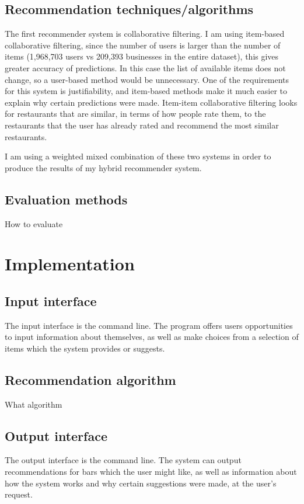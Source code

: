 \documentclass[conference]{IEEEtran}
\begin{document}
\subsection{Recommendation techniques/algorithms}
The first recommender system is collaborative filtering.
I am using item-based collaborative filtering, since the number of users is larger than the number of items 
(1,968,703 users vs 209,393 businesses in the entire dataset), this gives greater accuracy of predictions. 
In this case the list of available items does not change, so a user-based method would be unnecessary. 
One of the requirements for this system is justifiability, and item-based methods make it much easier to 
explain why certain predictions were made. 
Item-item collaborative filtering looks for restaurants that are similar, in terms of how people rate them, 
to the restaurants that the user has already rated and recommend the most similar restaurants. 

I am using a weighted mixed combination of these two systems in order to produce the results
of my hybrid recommender system.

\subsection{Evaluation methods}
How to evaluate


\section{Implementation}

\subsection{Input interface}
The input interface is the command line.
The program offers users opportunities to input information about themselves,
as well as make choices from a selection of items which the system provides or suggests.

\subsection{Recommendation algorithm}
What algorithm

\subsection{Output interface}
The output interface is the command line.
The system can output recommendations for bars which the user might like,
as well as information about how the system works and why certain suggestions were made,
at the user's request.
\end{document}
